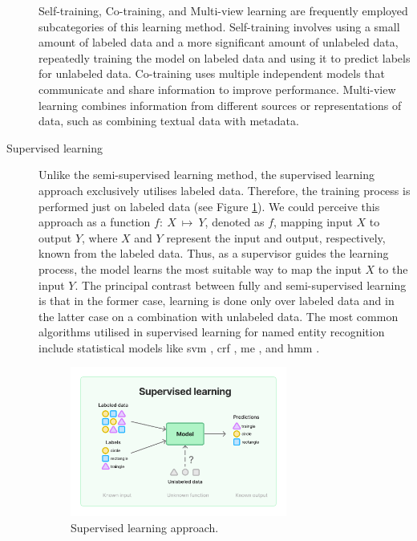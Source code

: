 \begin{description}
    Self-training, Co-training, and Multi-view learning are frequently employed subcategories of this learning method. Self-training involves using a small amount of labeled data and a more significant amount of unlabeled data, repeatedly training the model on labeled data and using it to predict labels for unlabeled data. Co-training uses multiple independent models that communicate and share information to improve performance. Multi-view learning combines information from different sources or representations of data, such as combining textual data with metadata.
    \item[Supervised learning] Unlike the semi-supervised learning method, the supervised learning approach exclusively utilises labeled data. Therefore, the training process is performed just on labeled data (see Figure \ref{fig:supervised-learning}). We could perceive this approach as a function $f:~X~\mapsto~Y$, denoted as $f$, mapping input $X$ to output $Y$, where $X$ and $Y$ represent the input and output, respectively, known from the labeled data. Thus, as a supervisor guides the learning process, the model learns the most suitable way to map the input $X$ to the input $Y$. The principal contrast between fully and semi-supervised learning is that in the former case, learning is done only over labeled data and in the latter case on a combination with unlabeled data. The most common algorithms utilised in supervised learning for named entity recognition include statistical models like \acrfull{svm} \parencite{wang2005svm}, \acrfull{crf} \parencite{sutton2012crf}, \acrfull{me} \parencite{berger1996me}, and \acrfull{hmm} \parencite{EDDY1996361hmm}.
    \begin{figure}[H]
        \centering
        \includegraphics[width=0.7\textwidth, interpolate=false]{img/theoretical/supervised.pdf}
        \caption{Supervised learning approach.}
        \label{fig:supervised-learning}
    \end{figure}

\end{description}
